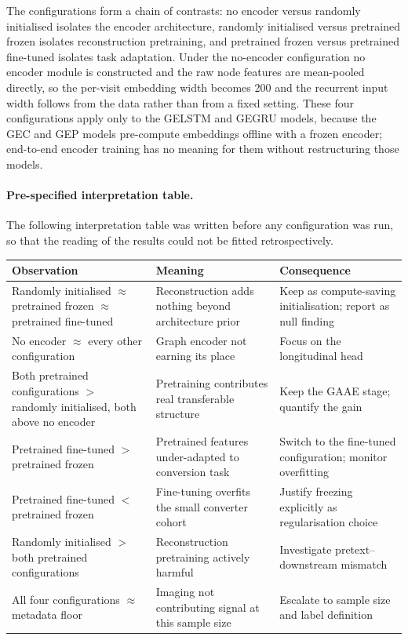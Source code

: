 The configurations form a chain of contrasts: no encoder versus randomly initialised
isolates the encoder architecture, randomly initialised versus pretrained frozen isolates
reconstruction pretraining, and pretrained frozen versus pretrained fine-tuned isolates
task adaptation. Under the no-encoder configuration no encoder module is constructed and
the raw node features are mean-pooled directly, so the per-visit embedding width becomes
200 and the recurrent input width follows from the data rather than from a fixed
setting. These four configurations apply only to the \ac{GELSTM} and
\ac{GEGRU} models, because the \ac{GEC} and \ac{GEP} models pre-compute embeddings
offline with a frozen encoder; end-to-end encoder training has no meaning for them without
restructuring those models.

\paragraph{Pre-specified interpretation table.}
The following interpretation table was written before any configuration was run, so that the reading
of the results could not be fitted retrospectively. 

\begin{center}
\footnotesize
\begin{tabularx}{\textwidth}{@{}p{}XX@{}}
\toprule
Observation & Meaning & Consequence \\
\midrule
Randomly initialised $\approx$ pretrained frozen \newline $\approx$ pretrained fine-tuned &
  Reconstruction adds nothing beyond architecture prior &
  Keep as compute-saving initialisation; report as null finding \\[3pt]
No encoder $\approx$ every other configuration &
  Graph encoder not earning its place &
  Focus on the longitudinal head \\[3pt]
Both pretrained configurations $>$ randomly initialised, \newline both above no encoder &
  Pretraining contributes real transferable structure &
  Keep the \ac{GAAE} stage; quantify the gain \\[3pt]
Pretrained fine-tuned $>$ pretrained frozen &
  Pretrained features under-adapted to conversion task &
  Switch to the fine-tuned configuration; monitor overfitting \\[3pt]
Pretrained fine-tuned $<$ pretrained frozen &
  Fine-tuning overfits the small converter cohort &
  Justify freezing explicitly as regularisation choice \\[3pt]
Randomly initialised $>$ both pretrained configurations &
  Reconstruction pretraining actively harmful &
  Investigate pretext--downstream mismatch \\[3pt]
All four configurations $\approx$ metadata floor &
  Imaging not contributing signal at this sample size &
  Escalate to sample size and label definition \\
\bottomrule
\end{tabularx}
\end{center}

